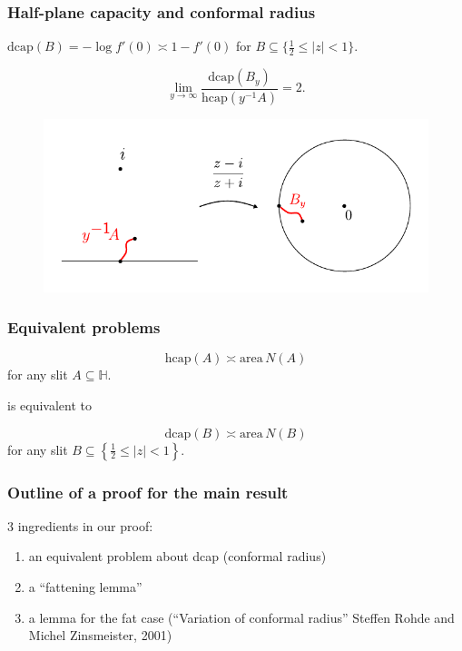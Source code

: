 \documentclass[xcolor=pdftex,dvipsnames,table]{beamer}
\newcommand{\bbH}{\mathbb{H}}
\newcommand{\half}{\frac{1}{2}}
\newcommand{\area}{\text{area}\,}
\newcommand{\dcap}{\text{dcap}}
\newcommand{\hcap}{\text{hcap}}
\theoremstyle{definition}
\begin{document}
\begin{frame}
  \frametitle{Half-plane capacity and conformal radius}
  $\dcap(B) = - \log f'(0) \asymp 1 - f'(0)$ for $B \subseteq \{ \half \leq \left| z \right| < 1 \}$.
  \begin{lemma}
    \[
      \lim_{y \to \infty} \frac{\dcap(B_y)}{\hcap(y^{-1}A)} = 2.
    \]  
  \end{lemma}
  \begin{figure}
      \includegraphics[scale=0.6]{hcap_dcap.pdf}
  \end{figure}
  \vspace{-0.1in}
\end{frame}

\begin{frame}
  \frametitle{Equivalent problems}
  \begin{problem}
    \[
        \hcap(A) \asymp \area N(A)
    \]
    for any slit $A \subseteq \bbH$.
  \end{problem}
  \vspace{.2in} is equivalent to \vspace{.2in}
  \begin{problem}
    \[
        \dcap(B) \asymp \area N(B)
    \]
    for any slit $B \subseteq \left\{ \half \leq \left|z\right| < 1 \right\}$.
  \end{problem}    
\end{frame}

\begin{frame}
  \frametitle{Outline of a proof for the main result}
  3 ingredients in our proof: \vspace{.2in}
  \begin{enumerate} \setlength{\itemsep}{.2in}
    \item  {\color{black!30} an equivalent problem about dcap (conformal radius)}
    \item  a ``fattening lemma''
    \item  a lemma for the fat case (``Variation of conformal radius''
              Steffen Rohde and Michel Zinsmeister, 2001)
  \end{enumerate}
\end{frame}
\end{document}
